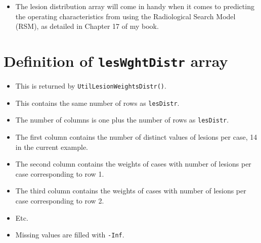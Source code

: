 \documentclass[]{book}
\providecommand{\tightlist}{%
  \setlength{\itemsep}{0pt}\setlength{\parskip}{0pt}}
\begin{document}
\begin{itemize}
\tightlist
\item
  The lesion distribution array will come in handy when it comes to predicting the operating characteristics from using the Radiological Search Model (RSM), as detailed in Chapter 17 of my book.
\end{itemize}

\hypertarget{definition-of-leswghtdistr-array}{%
\section{\texorpdfstring{Definition of \texttt{lesWghtDistr} array}{Definition of lesWghtDistr array}}\label{definition-of-leswghtdistr-array}}

\begin{itemize}
\tightlist
\item
  This is returned by \texttt{UtilLesionWeightsDistr()}.
\item
  This contains the same number of rows as \texttt{lesDistr}.
\item
  The number of columns is one plus the number of rows as \texttt{lesDistr}.
\item
  The first column contains the number of distinct values of lesions per case, 14 in the current example.
\item
  The second column contains the weights of cases with number of lesions per case corresponding to row 1.
\item
  The third column contains the weights of cases with number of lesions per case corresponding to row 2.
\item
  Etc.
\item
  Missing values are filled with \texttt{-Inf}.
\end{itemize}
\end{document}
